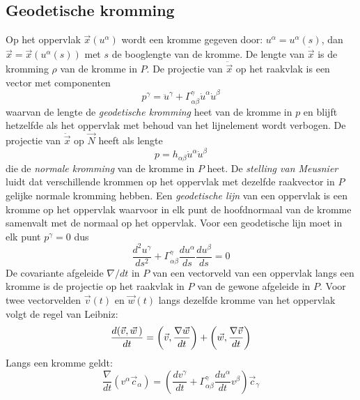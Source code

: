 \subsection{Geodetische kromming}
Op het oppervlak $\vec{x}(u^\alpha)$ wordt een kromme gegeven door:
$u^\alpha=u^\alpha(s)$, dan $\vec{x}=\vec{x}(u^\alpha(s))$ met $s$ de booglengte
van de kromme. De lengte van $\ddot{\vec{x}}$ is de kromming $\rho$ van de
kromme in $P$. De projectie van $\ddot{\vec{x}}$ op het raakvlak is een
vector met componenten
\[
p^\gamma=\ddot{u}^\gamma+\Gamma^\gamma_{\alpha\beta}\dot{u}^\alpha\dot{u}^\beta
\]
waarvan de lengte de {\it geodetische kromming} heet van de kromme in $p$ en
blijft hetzelfde als het oppervlak met behoud van het lijnelement wordt
verbogen. De projectie van $\ddot{\vec{x}}$ op $\vec{N}$ heeft als lengte
\[
p=h_{\alpha\beta}\dot{u}^\alpha\dot{u}^\beta
\]
die de {\it normale kromming} van de kromme in $P$ heet. De {\it stelling van
Meusnier} luidt dat verschillende krommen op het oppervlak met dezelfde
raakvector in $P$ gelijke normale kromming hebben.
\npar
Een {\it geodetische lijn} van een oppervlak is een kromme op het oppervlak
waarvoor in elk punt de hoofdnormaal van de kromme samenvalt met de normaal op
het oppervlak. Voor een geodetische lijn moet in elk punt $p^\gamma=0$ dus
\[
\frac{d^2u^\gamma}{ds^2}+\Gamma^\gamma_{\alpha\beta}\frac{du^\alpha}{ds}\frac{du^\beta}{ds}=0
\]
De covariante afgeleide $\nabla/dt$ in $P$ van een vectorveld van een oppervlak
langs een kromme is de projectie op het raakvlak in $P$ van de gewone afgeleide
in $P$.
\npar
Voor twee vectorvelden $\vec{v}(t)$ en $\vec{w}(t)$ langs dezelfde kromme van
het oppervlak volgt de regel van Leibniz:
\[
\frac{d(\vec{v},\vec{w}\,)}{dt}=\left(\vec{v},\frac{\nabla\vec{w}}{dt}\right)+\left(\vec{w},\frac{\nabla\vec{v}}{dt}\right)
\]
Langs een kromme geldt:
\[
\frac{\nabla}{dt}(v^\alpha\vec{c}_\alpha)=\left(\frac{dv^\gamma}{dt}+\Gamma^\gamma_{\alpha\beta}\frac{du^\alpha}{dt}v^\beta\right)\vec{c}_\gamma
\]

